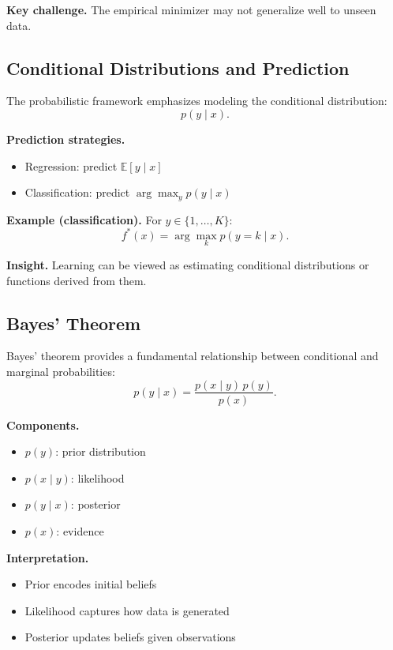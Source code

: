 \medskip

\noindent
\textbf{Key challenge.}  
The empirical minimizer may not generalize well to unseen data.

\subsection{Conditional Distributions and Prediction}

The probabilistic framework emphasizes modeling the conditional distribution:
\[
p(y \mid x).
\]

\medskip

\noindent
\textbf{Prediction strategies.}
\begin{itemize}
    \item Regression: predict $\mathbb{E}[y \mid x]$
    \item Classification: predict $\arg\max_y p(y \mid x)$
\end{itemize}

\medskip

\noindent
\textbf{Example (classification).}  
For $y \in \{1, \dots, K\}$:
\[
f^*(x) = \arg\max_k p(y = k \mid x).
\]

\medskip

\noindent
\textbf{Insight.}  
Learning can be viewed as estimating conditional distributions or functions derived from them.

\subsection{Bayes’ Theorem}

Bayes’ theorem provides a fundamental relationship between conditional and marginal probabilities:
\[
p(y \mid x) = \frac{p(x \mid y)\, p(y)}{p(x)}.
\]

\medskip

\noindent
\textbf{Components.}
\begin{itemize}
    \item $p(y)$: prior distribution
    \item $p(x \mid y)$: likelihood
    \item $p(y \mid x)$: posterior
    \item $p(x)$: evidence
\end{itemize}

\medskip

\noindent
\textbf{Interpretation.}
\begin{itemize}
    \item Prior encodes initial beliefs
    \item Likelihood captures how data is generated
    \item Posterior updates beliefs given observations
\end{itemize}

